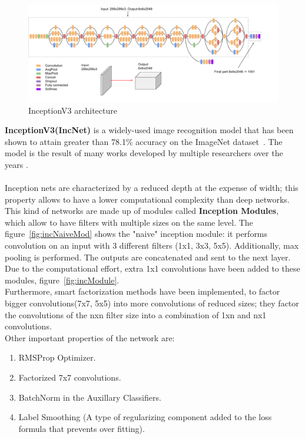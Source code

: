 \begin{figure}[ht]
    \centering
        \includegraphics[width=\linewidth]{images/inception_v3_architecture.png}
    \caption{InceptionV3 architecture}
    \label{fig:IncV3}
\end{figure}
\textbf{InceptionV3(IncNet)} is a widely-used image recognition model that has been shown to attain greater than 78.1\% accuracy on the ImageNet dataset~\cite{ImageNet}. The model is the result of many works developed by multiple researchers over the years \cite{IncNet}.\\\\
Inception nets are characterized by a reduced depth at the expense of width; this property allows to have a lower computational complexity than deep networks. \\
This kind of networks are made up of modules called \textbf{Inception Modules}, which allow to have filters with multiple sizes on the same level. The figure~\ref{fig:incNaiveMod} shows the "naive" inception module: it performs convolution on an input with 3 different filters (1x1, 3x3, 5x5). Additionally, max pooling is performed. The outputs are concatenated and sent to the next layer.
Due to the computational effort, extra 1x1 convolutions have been added to these modules, figure~\ref{fig:incModule}.\\
Furthermore, smart factorization methods have been implemented, to factor bigger convolutions(7x7, 5x5) into more convolutions of reduced sizes; they factor the convolutions of the nxn filter size into a combination of 1xn and nx1 convolutions.\\
Other important properties of the network are:
\begin{enumerate}
    \item RMSProp Optimizer.
\item Factorized 7x7 convolutions.
\item BatchNorm in the Auxillary Classifiers.
\item Label Smoothing (A type of regularizing component added to the loss formula that prevents over fitting).
\end{enumerate}

